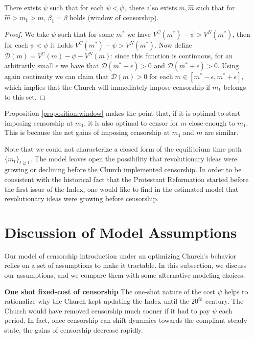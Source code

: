 \begin{proposition}
\label{proposition:window}
There exists $\overline{\psi}$ such that for each $\psi<\overline{\psi},\;\text{there also exists} \;\overline{m},\hat{m}$ such that for $\hat{m}>m_{1}>\overline{m}$, $\beta_1=\overline{\beta}$ holds (window of censorship).
\end{proposition}
\begin{proof}
We take $\overline{\psi}$ such that for some $m^*$ we have $V^C(m^*)-\overline{\psi}>V^N(m^*)$, then for each$\;\psi<\overline{\psi}$ it holds $V^C(m^*)-\psi>V^N(m^*)$. Now define $\mathcal{D}(m)=V^C(m)-\psi-V^N(m)$: since this function is continuous, for an arbitrarily small $\epsilon$ we have that $\mathcal{D}(m^*-\epsilon)>0$ and $\mathcal{D}(m^*+\epsilon)>0$. Using again continuity we can claim that $\mathcal{D}(m)>0\;\text{for each}\;m\in[m^*-\epsilon,m^*+\epsilon]$, which implies that the Church will immediately impose censorship if $m_{1}$ belongs to this set.
\end{proof}

Proposition \ref{proposition:window} makes the point that, if it is optimal to start imposing censorship at $m_{1}$, it is also optimal to censor for $m$ close enough to $m_1$. This is because the net gains of imposing censorship at $m_1$ and $m$ are similar.

Note that we could not characterize a closed form of the equilibrium time path $\{m_t\}_{t\geq1}$. The model leaves open the possibility that revolutionary ideas were growing or declining before the Church implemented censorship. In order to be  consistent with the historical fact that the Protestant Reformation started before the first issue of the Index,  one would like to find in the estimated model that revolutionary ideas were growing before censorship.




\section{Discussion of Model Assumptions}\label{subsection:modela}

Our model of censorship introduction under an optimizing Church's behavior relies on a set of assumptions to make it tractable. In this subsection, we discuss our assumptions, and we compare them with some alternative modeling choices.

\textbf{One shot fixed-cost of censorship} The one-shot nature of the cost $\psi$ helps to rationalize why the Church kept updating the Index until the $20^{th}$ century. The Church would have removed censorship much sooner if it had to pay $\psi$ each period. In fact, once censorship can shift dynamics towards the compliant steady state, the gains of censorship decrease rapidly.


